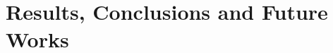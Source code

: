 \documentclass[letterpaper,11pt,oneside,final]{uicthesis}
\theoremstyle{mythstyle}
\begin{document}
% 		

\chapter{Results, Conclusions and Future Works}
	\label{cha:conclusions}
	

	\clearpage
	\appendices
		\appendix \label{app:a}
		

	\clearpage
	\bib
	
	\nocite{*}

	\newpage

	
\end{document}
